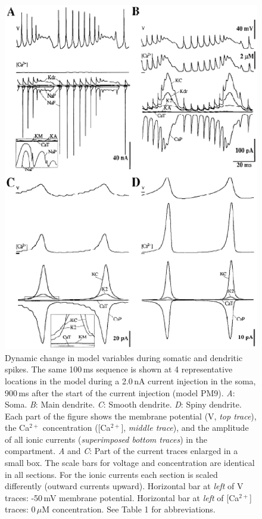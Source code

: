 \documentclass[12pt]{article}
\begin{document}
\begin{figure}[h]
\centering
   \includegraphics[scale=0.75]{figures/Fig.1.11.eps}
   \caption{Dynamic change in model variables during somatic and dendritic spikes. The same 100\,ms sequence is shown at 4 representative locations in the model during a 2.0\,nA current injection in the soma, 900\,ms after the start of the current injection (model PM9). {\it A}: Soma. {\it B}: Main dendrite. {\it C}: Smooth dendrite. {\it D}: Spiny dendrite. Each part of the figure shows the membrane potential (V, {\em top trace}), the Ca$^{2+}$ concentration ([Ca$^{2+}$], {\em middle trace}), and the amplitude of all ionic currents ({\em superimposed bottom traces}) in the compartment. {\it A} and {\it C}: Part of the current traces enlarged in a small box. The scale bars for voltage and concentration are identical in all sections. For the ionic currents each section is scaled differently (outward currents upward). Horizontal bar at {\em left} of V traces: -50\,mV membrane potential. Horizontal bar at {\em left} of [Ca$^{2+}$] traces: 0\,$\mu$M concentration. See Table 1 for abbreviations.}
   \label{fig:DS1.11}
\end{figure}
\end{document}
